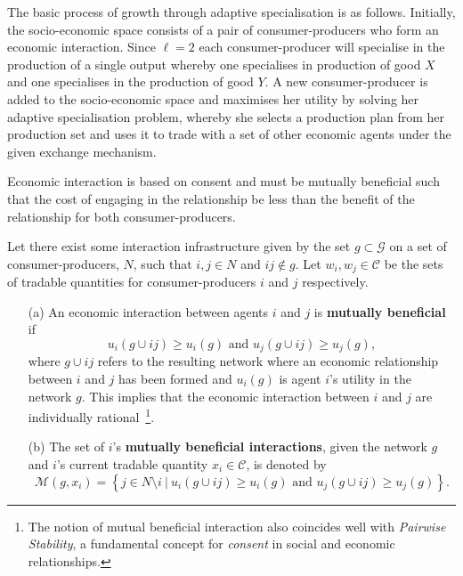 The basic process of growth through adaptive specialisation is as follows. Initially, the socio-economic space consists of a pair of consumer-producers who form an economic interaction. Since $\ell = 2$ each consumer-producer will specialise in the production of a single output whereby one specialises in production of good $X$ and one specialises in the production of good $Y$. A new consumer-producer is added to the socio-economic space and maximises her utility by solving her adaptive specialisation problem, whereby she selects a production plan from her production set and uses it to trade with a set of other economic agents under the given exchange mechanism.

Economic interaction is based on consent and must be mutually beneficial such that the cost of engaging in the relationship be less than the benefit of the relationship for both consumer-producers.

\begin{definition}
Let there exist some interaction infrastructure given by the set $g \subset \mathcal{G}$ on a set of consumer-producers, $N$, such that $i,j \in N$ and $ij \notin g$. Let $w_{i}, w_{j} \in \mathcal{C}$ be the sets of tradable quantities for consumer-producers $i$ and $j$ respectively.
\begin{itemize}
	\item[(a)] An economic interaction between agents $i$ and $j$ is \textbf{mutually beneficial} if
	\begin{equation}
	u_{i}(g \cup ij) \geqslant u_{i}(g) \mbox{ and } u_{j}(g \cup ij) \geqslant u_{j}(g) ,
	\end{equation}
	where $g \cup ij$ refers to the resulting network where an economic relationship between $i$ and $j$ has been formed and $u_{i}(g)$ is agent $i$'s utility in the network $g$. This implies that the economic interaction between $i$ and $j$ are individually rational~\footnote{The notion of mutual beneficial interaction also coincides well with \emph{Pairwise Stability}, a fundamental concept for \emph{consent} in social and economic relationships.}.

	\item[(b)] The set of $i$'s \textbf{mutually beneficial interactions}, given the network $g$ and $i$'s current tradable quantity $x_{i} \in \mathcal{C}$, is denoted by
	\begin{equation}
	\mathcal{M}(g,x_{i}) = \left\{ j \in N \setminus i ~ | ~ u_{i}(g \cup ij) \geqslant u_{i}(g) \mbox{ and } u_{j}(g \cup ij) \geqslant u_{j}(g) \right\}.
	\end{equation}
\end{itemize}
\end{definition}

